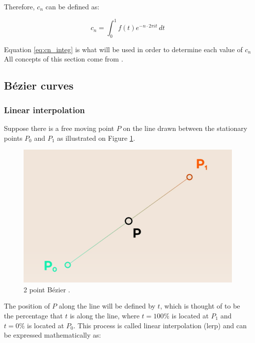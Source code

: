 \documentclass[letterpaper, 12pt]{article}
\begin{document}
Therefore, \(c_n\) can be defined as:

\begin{equation}
    c_n = \int_{0}^{1} f(t) e^{-n \cdot 2\pi it} \,dt
    \label{eq:cn_integ}
\end{equation}

Equation \ref*{eq:cn_integ} is what will be used in order to
determine each value of \(c_n\)
\\

All concepts of this section come from \cite{sandersonWhatFourierSeries2019}.


\subsection{Bézier curves}

\subsubsection{Linear interpolation}

Suppose there is a free moving point \(P\) on the line drawn between
the stationary points \(P_0\) and \(P_1\) as illustrated on
Figure \ref*{fig:2_point_bezier}.

\begin{figure}[H]
    \centering
    \includegraphics[width=.8\textwidth]{2_point_bezier.png}
    \caption{2 point Bézier \protect\cite{holmerBeautyBezierCurves2021}.}
    \label{fig:2_point_bezier}
\end{figure}

The position of \(P\) along the line will be defined by \(t\), which
is thought of to be the percentage that \(t\) is along the line,
where \(t = 100\%\) is located at \(P_1\) and \(t = 0\%\) is located
at \(P_0\). This process is called linear interpolation (lerp) and
can be expressed mathematically as:
\end{document}
